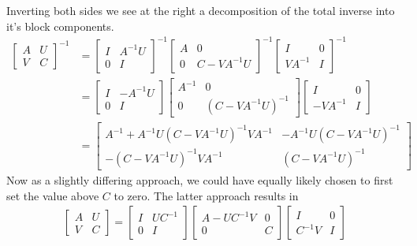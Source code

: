 \documentclass{article}
\begin{document}
Inverting both sides we see at the right a decomposition of the total inverse into it's block components.
\begin{align*}
	\left[ \begin{array}{cc}{A} & {U} \\ {V} & {C}\end{array}\right]^{-1}&=\left[ \begin{array}{cc}{I} & {A^{-1} U} \\ {0} & {I}\end{array}\right]^{-1} \left[ \begin{array}{cc}{A} & {0} \\ {0} & {C-V A^{-1} U}\end{array}\right]^{-1} \left[ \begin{array}{cc}{I} & {0} \\ {V A^{-1}} & {I}\end{array}\right]^{-1}\\
&=\left[ \begin{array}{cc}{I} & {-A^{-1} U} \\ {0} & {I}\end{array}\right] \left[ \begin{array}{cc}{A^{-1}} & {0} \\ {0} & {\left(C-V A^{-1} U\right)^{-1}}\end{array}\right] \left[ \begin{array}{cc}{I} & {0} \\ {-V A^{-1}} & {I}\end{array}\right]\\
&=\left[ \begin{array}{cc}{A^{-1}+A^{-1} U\left(C-V A^{-1} U\right)^{-1} V A^{-1}} & {-A^{-1} U\left(C-V A^{-1} U\right)^{-1}} \\ {-\left(C-V A^{-1} U\right)^{-1} V A^{-1}} & {\left(C-V A^{-1} U\right)^{-1}}\end{array}\right]
\end{align*}
\bigbreak
Now as a slightly differing approach, we could have equally likely chosen to first set the value above $C$ to zero. The latter approach results in
\begin{align*}
\left[ \begin{array}{cc}{A} & {U} \\ {V} & {C}\end{array}\right]=\left[ \begin{array}{cc}{I} & {U C^{-1}} \\ {0} & {I}\end{array}\right] \left[ \begin{array}{cc}{A-U C^{-1} V} & {0} \\ {0} & {C}\end{array}\right] \left[ \begin{array}{cc}{I} & {0} \\ {C^{-1} V} & {I}\end{array}\right]
\end{align*}
\end{document}
